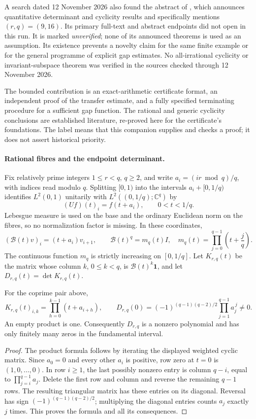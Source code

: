 A search dated 12 November 2026 also found the abstract of
\citet{ma2026rational}, which announces quantitative determinant and cyclicity
results and specifically mentions \((r,q)=(9,16)\).  Its primary full-text
and abstract endpoints did not open in this run.  It is marked
\emph{unverified}; none of its announced theorems is used as an assumption.
Its existence prevents a novelty claim for the same finite example or for
the general programme of explicit gap estimates.  No all-irrational
cyclicity or invariant-subspace theorem was verified in the sources checked
through 12 November 2026.

The bounded contribution is an exact-arithmetic certificate format, an
independent proof of the transfer estimate, and a fully specified terminating
procedure for a sufficient gap function.  The rational and generic
cyclicity conclusions are established literature, re-proved here for the
certificate's foundations.  The label \ours{} means that this companion
supplies and checks a proof; it does not assert historical priority.

\paragraph{Rational fibres and the endpoint determinant.}
Fix relatively prime integers \(1\le r<q\), \(q\ge2\), and write
\(a_i=(ir\bmod q)/q\), with indices read modulo \(q\).
Splitting \([0,1)\) into the intervals \(a_i+[0,1/q)\) identifies
\(L^2(0,1)\) unitarily with
\(L^2((0,1/q);\mathbb C^q)\) by
\[
 (Uf)(t)_i=f(t+a_i),\qquad 0<t<1/q.
\]
Lebesgue measure is used on the base and the ordinary Euclidean norm on the
fibres, so no normalization factor is missing.  In these coordinates,
\[
 (\mathcal B(t)v)_i=(t+a_i)v_{i+1},\qquad
 \mathcal B(t)^q=m_q(t)I,
 \quad m_q(t)=\prod_{j=0}^{q-1}\left(t+\frac jq\right).
\]
The continuous function \(m_q\) is strictly increasing on \([0,1/q]\).
Let \(K_{r,q}(t)\) be the matrix whose column \(k\), \(0\le k<q\), is
\(\mathcal B(t)^k\mathbf1\), and let \(D_{r,q}(t)=\det K_{r,q}(t)\).

\begin{lemma}\ours{}
\label{lem:bishop-endpoint}
For the coprime pair above,
\[
 K_{r,q}(t)_{i,k}=\prod_{h=0}^{k-1}(t+a_{i+h}),\qquad
 D_{r,q}(0)=(-1)^{(q-1)(q-2)/2}\prod_{j=1}^{q-1}a_j^{\,j}\ne0.
\]
An empty product is one.  Consequently \(D_{r,q}\) is a nonzero polynomial
and has only finitely many zeros in the fundamental interval.
\end{lemma}
\begin{proof}
The product formula follows by iterating the displayed weighted cyclic
matrix.  Since \(a_0=0\) and every other \(a_i\) is positive, row zero at
\(t=0\) is \((1,0,\ldots,0)\).  In row \(i\ge1\), the last possibly
nonzero entry is column \(q-i\), equal to
\(\prod_{j=i}^{q-1}a_j\).  Delete the first row and column and reverse the
remaining \(q-1\) rows.  The resulting triangular matrix has these entries
on its diagonal.  Reversal has sign
\((-1)^{(q-1)(q-2)/2}\); multiplying the diagonal entries counts \(a_j\)
exactly \(j\) times.  This proves the formula and all its consequences.
\end{proof}

